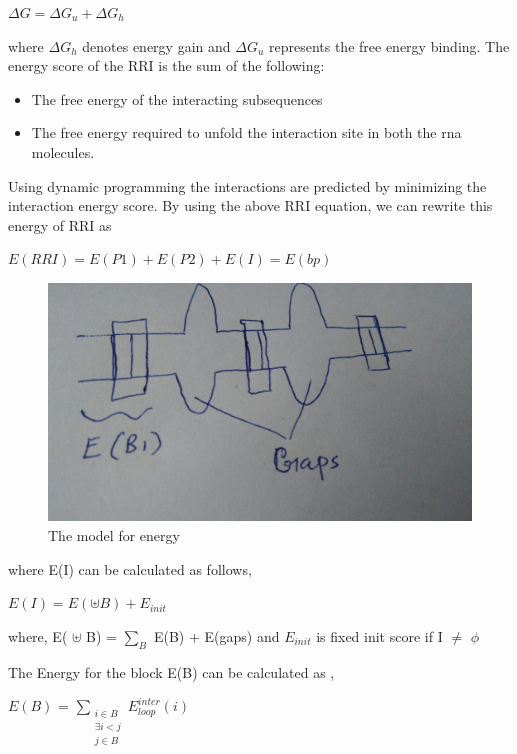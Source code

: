 \documentclass[twoside,a4paper]{report}
\begin{document}
 	\begin{center}
 			$\Delta G = \Delta G_u + \Delta G_h$
 	\end{center}
 
	where $ \Delta G_h$ denotes energy gain and $\Delta G_u$ represents the free energy binding. The energy score of the RRI is the sum of the following:\\
		\begin{itemize}
		\item  The free energy of the interacting subsequences
		\item  The free energy required to unfold the interaction site in both the rna molecules.
		\end{itemize}
	
	Using dynamic programming the interactions are predicted by minimizing the interaction energy score. By using the above RRI equation, we can rewrite this energy of RRI as \\
	
	\begin{center}
		$E(RRI) = E(P1)+E(P2)+E(I) = E(bp)$ 
	\end{center}
	
	\begin{figure}[H]
		\includegraphics[width=0.6\linewidth]{ene}
		\centering
		\caption{The model for energy  }
		\label{fig:ene}
	\end{figure}

	where E(I) can be calculated as follows,
	
	\begin{center}
		$E(I) = E(  \uplus  B) + E_{init} $
	\end{center}
	\begin{center}
		where, E( $ \uplus $ B) = $\sum_B$ E(B) + E(gaps) and $E_{init}$ is fixed init score if I $\neq$ $\phi$ 
	\end{center}
		
	The Energy for the block E(B) can be calculated as  ,
	
	\begin{center}
	$E(B)$ =  $\sum_{\substack{i \in B \\ \exists i < j \\ j \in B}}E^{inter}_{loop} (i)$
	\end{center}	
	
\end{document}
